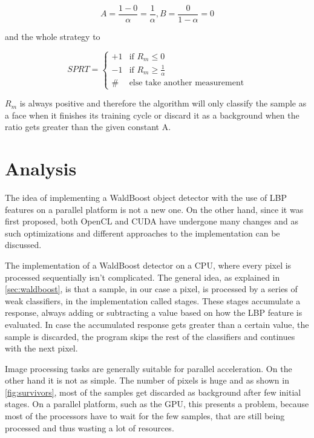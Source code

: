 \begin{equation}
A=\frac{1-0}{\alpha}=\frac{1}{\alpha}, B=\frac{0}{1-\alpha}=0
\end{equation}

and the whole strategy to

\[
 SPRT =
  \begin{cases}
   +1 & \text{if } R_{m} \leq 0 \\
   -1 & \text{if } R_{m} \geq \frac{1}{\alpha} \\
   \# & \text{else take another measurement} 
  \end{cases}
\]

$R_{m}$ is always positive and therefore the algorithm will only classify the sample as a face when it finishes its training cycle or discard it as a background when the ratio gets greater than the given constant A.

\chapter{Analysis}

The idea of implementing a WaldBoost object detector with the use of LBP features on a parallel platform is not a new one. On the other hand, since it was first proposed, both OpenCL and CUDA have undergone many changes and as such optimizations and different approaches to the implementation can be discussed.

The implementation of a WaldBoost detector on a CPU, where every pixel is processed sequentially isn't complicated. The general idea, as explained in \ref{sec:waldboost}, is that a sample, in our case a pixel, is processed by a series of weak classifiers, in the implementation called stages. These stages accumulate a response, always adding or subtracting a value based on how the LBP feature is evaluated. In case the accumulated response gets greater than a certain value, the sample is discarded, the program skips the rest of the classifiers and continues with the next pixel.

Image processing tasks are generally suitable for parallel acceleration. On the other hand it is not as simple. The number of pixels is huge and as shown in \ref{fig:survivors}, most of the samples get discarded as background after few initial stages. On a parallel platform, such as the GPU, this presents a problem, because most of the processors have to wait for the few samples, that are still being processed and thus wasting a lot of resources.

